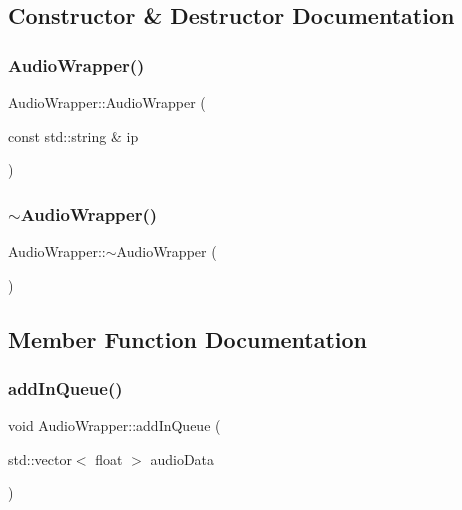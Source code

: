 \subsection{Constructor \& Destructor Documentation}
\mbox{\label{classAudioWrapper_a13297af5ffc1d5f9d5d751820ef42acc}} 
\subsubsection{\texorpdfstring{Audio\+Wrapper()}{AudioWrapper()}}
{\footnotesize\ttfamily Audio\+Wrapper\+::\+Audio\+Wrapper (\begin{DoxyParamCaption}\item[{const std\+::string \&}]{ip }\end{DoxyParamCaption})\hspace{0.3cm}{\ttfamily [explicit]}}

\mbox{\label{classAudioWrapper_ae46cc45c2060c761ab7e0d4901b19cc0}} 
\subsubsection{\texorpdfstring{$\sim$\+Audio\+Wrapper()}{~AudioWrapper()}}
{\footnotesize\ttfamily Audio\+Wrapper\+::$\sim$\+Audio\+Wrapper (\begin{DoxyParamCaption}{ }\end{DoxyParamCaption})\hspace{0.3cm}{\ttfamily [override]}}



\subsection{Member Function Documentation}
\mbox{\label{classAudioWrapper_a3364ec91d1a0d8d8a17e8f11ef4bcf6c}} 
\subsubsection{\texorpdfstring{add\+In\+Queue()}{addInQueue()}}
{\footnotesize\ttfamily void Audio\+Wrapper\+::add\+In\+Queue (\begin{DoxyParamCaption}\item[{std\+::vector$<$ float $>$}]{audio\+Data }\end{DoxyParamCaption})}

